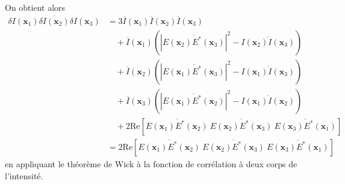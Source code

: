On obtient alors 
\begin{align}
\overline{\delta I(\mathbf{x}_1) \delta I(\mathbf{x}_2) \delta I(\mathbf{x}_3)} &= 3 \overline{I}(\mathbf{x}_1) \overline{I}(\mathbf{x}_2) \overline{I}(\mathbf{x}_3)\\
\nonumber & \quad + \overline{I}(\mathbf{x}_1) \left( \left|\overline{E(\mathbf{x}_2)E^*(\mathbf{x}_3)} \right|^2 -\overline{I(\mathbf{x}_2)I(\mathbf{x}_3)}\right) \\
\nonumber & \quad + \overline{I}(\mathbf{x}_2) \left( \left|\overline{E(\mathbf{x}_1)E^*(\mathbf{x}_3)}\right|^2 - \overline{I(\mathbf{x}_1)I(\mathbf{x}_3)}\right)\\
\nonumber & \quad + \overline{I}(\mathbf{x}_3) \left(\left|\overline{E(\mathbf{x}_1)E^*(\mathbf{x}_2)}\right|^2 -\overline{I(\mathbf{x}_1)I(\mathbf{x}_2)}\right)\\
\nonumber & \quad + 2\mathrm{Re}\left[ \overline{E(\mathbf{x}_1)E^*(\mathbf{x}_2)} \: \overline{E(\mathbf{x}_2)E^*(\mathbf{x}_3)} \: \overline{E(\mathbf{x}_3)E^*(\mathbf{x}_1)}\right] \\
&= 2\mathrm{Re}\left[ \overline{E(\mathbf{x}_1)E^*(\mathbf{x}_2)} \: \overline{E(\mathbf{x}_2)E^*(\mathbf{x}_3)} \: \overline{E(\mathbf{x}_3)E^*(\mathbf{x}_1)}\right]
\label{eq:wick_3corps}
\end{align}
en appliquant le théorème de Wick à la fonction de corrélation à deux corps de l'intensité.





